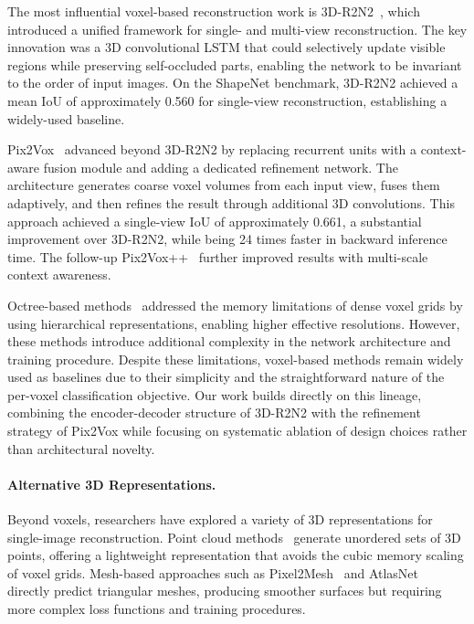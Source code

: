\documentclass[10pt,twocolumn,letterpaper]{article}
\begin{document}
The most influential voxel-based reconstruction work is 3D-R2N2~\cite{choy2016r2n2}, which introduced a unified framework for single- and multi-view reconstruction. The key innovation was a 3D convolutional LSTM that could selectively update visible regions while preserving self-occluded parts, enabling the network to be invariant to the order of input images. On the ShapeNet benchmark, 3D-R2N2 achieved a mean IoU of approximately 0.560 for single-view reconstruction, establishing a widely-used baseline.

Pix2Vox~\cite{xie2019pix2vox} advanced beyond 3D-R2N2 by replacing recurrent units with a context-aware fusion module and adding a dedicated refinement network. The architecture generates coarse voxel volumes from each input view, fuses them adaptively, and then refines the result through additional 3D convolutions. This approach achieved a single-view IoU of approximately 0.661, a substantial improvement over 3D-R2N2, while being 24 times faster in backward inference time. The follow-up Pix2Vox++~\cite{xie2020pix2voxpp} further improved results with multi-scale context awareness.

Octree-based methods~\cite{tatarchenko2017octree} addressed the memory limitations of dense voxel grids by using hierarchical representations, enabling higher effective resolutions. However, these methods introduce additional complexity in the network architecture and training procedure. Despite these limitations, voxel-based methods remain widely used as baselines due to their simplicity and the straightforward nature of the per-voxel classification objective. Our work builds directly on this lineage, combining the encoder-decoder structure of 3D-R2N2 with the refinement strategy of Pix2Vox while focusing on systematic ablation of design choices rather than architectural novelty.

\paragraph{Alternative 3D Representations.}
Beyond voxels, researchers have explored a variety of 3D representations for single-image reconstruction. Point cloud methods~\cite{fan2017pointset} generate unordered sets of 3D points, offering a lightweight representation that avoids the cubic memory scaling of voxel grids. Mesh-based approaches such as Pixel2Mesh~\cite{wang2018pixel2mesh} and AtlasNet~\cite{groueix2018atlasnet} directly predict triangular meshes, producing smoother surfaces but requiring more complex loss functions and training procedures.
\end{document}

